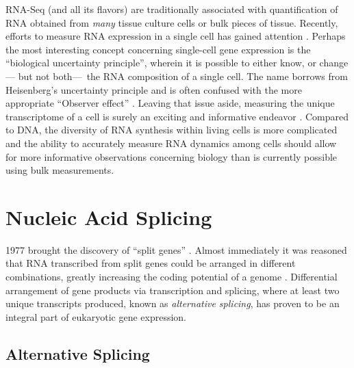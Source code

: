     RNA-Seq (and all its flavors) are traditionally associated with quantification of RNA obtained from \textit{many} tissue culture cells or bulk pieces of tissue. Recently, efforts to measure RNA expression in a single cell has gained attention \citep{Shapiro2013b}. Perhaps the most interesting concept concerning single-cell gene expression is the ``biological uncertainty principle'', wherein it is possible to either know, or change --- but not both---~the RNA composition of a single cell. The name borrows from Heisenberg's uncertainty principle \citep{Kennard1927} and is often confused with the more appropriate ``Observer effect'' \citep{Riley2013}. Leaving that issue aside, measuring the unique transcriptome of a cell is surely an exciting and informative endeavor \citep{Marinov2013, Shalek2013b,Wills2013}. Compared to DNA, the diversity of RNA synthesis within living cells is more complicated \citep{Shendure2012} and the ability to accurately measure RNA dynamics among cells should allow for more informative observations concerning biology than is currently possible using bulk measurements.

\section{Nucleic Acid Splicing}
  \label{Intro:sec:Nucleic Acid Splicing}

  1977 brought the discovery of ``split genes'' \citep{Berget1977,Chow1977}. Almost immediately it was reasoned that RNA transcribed from split genes could be arranged in different combinations, greatly increasing the coding potential of a genome \citep{Gilbert1978a}. Differential arrangement of gene products via transcription and splicing, where at least two unique transcripts produced, known as \textit{alternative splicing}, has proven to be an integral part of eukaryotic gene expression.

  \subsection{Alternative Splicing}
    \label{Intro:subsec:Alternative Splicing}

